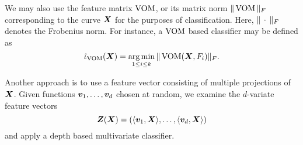 We may also use the feature matrix $\operatorname{VOM}$, or its matrix norm $\Vert \operatorname{VOM} \Vert_F$
corresponding to the curve $\bm{X}$ for the purposes of classification.
Here, $\Vert \,\cdot\, \Vert_F$ denotes the Frobenius norm.
For instance, a $\operatorname{VOM}$ based classifier may be defined as
\begin{equation}
    \hat{\iota}_{\operatorname{VOM}}(\bm{X}) = \operatorname*{arg\,min}_{1 \leq i \leq k} \Vert \operatorname{VOM}(\bm{X}, F_i) \Vert_F.
\end{equation}



Another approach is to use a feature vector consisting of multiple projections
of $\bm{X}$.
Given functions $\bm{v}_1, \dots, \bm{v}_d$ chosen at random, we examine the
$d$-variate feature vectors
\begin{equation}
    \bm{Z}(\bm{X}) = \left(\langle \bm{v}_1, \bm{X} \rangle, \dots, \langle \bm{v}_d, \bm{X} \rangle\right)
\end{equation}
and apply a depth based multivariate classifier.
